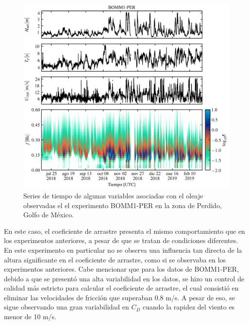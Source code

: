 \documentclass[11pt]{article}
\begin{document}
\begin{figure}[htpb]
  \centering
  \includegraphics[width=0.85\linewidth]{../figures/bomm1_per_wave_parameters.png}
  \caption{
    Series de tiempo de algunas variables asociadas con el oleaje observadas el
    el experimento BOMM1-PER en la zona de Perdido, Golfo de México.
  }
  \label{fig:bomm1_per_wave_parameters}
\end{figure}

En este caso, el coeficiente de arrastre presenta el mismo comportamiento que en
los experimentos anteriores, a pesar de que se tratan de condiciones diferentes.
En este experimento en particular no se observa una influencia tan directa de la
altura significante en el coeficiente de arrastre, como si se observaba en los
experimentos anteriores. Cabe mencionar que para los datos de BOMM1-PER, debido
a que se presentó una alta variabilidad en los datos, se hizo un control de
calidad más estricto para calcular el coeficiente de arrastre, el cual consistió
en eliminar las velocidades de fricción que superaban 0.8 m/s. A pesar de eso,
se sigue observando una gran variabilidad en $C_D$ cuando la rapidez del viento
es menor de 10 m/s.
\end{document}
